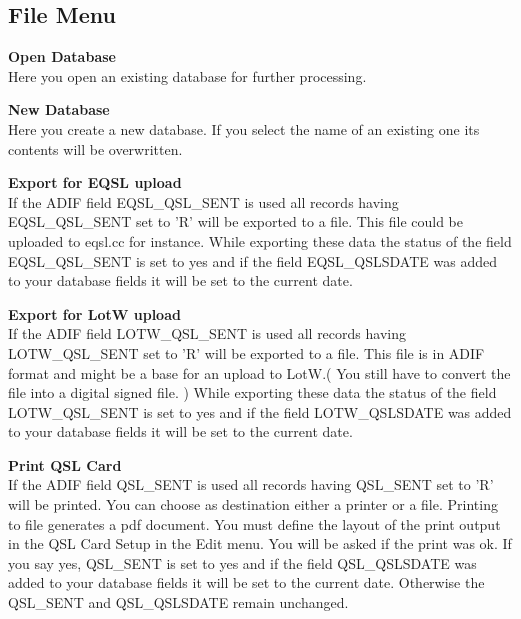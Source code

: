 \documentclass[a4paper,11pt]{article}
\begin{document}
\subsection{File Menu}
\begin{flushleft}


\textbf{Open Database}\\
Here you open an existing database for further processing.\linebreak

\textbf{New Database}\\
Here you create a new database. If you select the name of an existing one its
contents will be overwritten.\linebreak

\textbf{Export for EQSL upload}\\
If the ADIF field EQSL\_QSL\_SENT is used all records having EQSL\_QSL\_SENT
set to ’R’ will be exported to a file. This file could be uploaded to eqsl.cc for
instance. While exporting these data the status of the field EQSL\_QSL\_SENT
is set to yes and if the field EQSL\_QSLSDATE was added to your database
fields it will be set to the current date.\linebreak

\textbf{Export for LotW upload}\\
If the ADIF field LOTW\_QSL\_SENT is used all records having LOTW\_QSL\_SENT
set to ’R’ will be exported to a file. This file is in ADIF format and might
be a base for an upload to LotW.( You still have to convert the file into
a digital signed file. ) While exporting these data the status of the field
LOTW\_QSL\_SENT is set to yes and if the field LOTW\_QSLSDATE was added
to your database fields it will be set to the current date.\linebreak

\textbf{Print QSL Card}\\
If the ADIF field QSL\_SENT is used all records having QSL\_SENT set to ’R’
will be printed. You can choose as destination either a printer or a file. Printing
to file generates a pdf document. You must define the layout of the print output
in the QSL Card Setup in the Edit menu. You will be asked if the print was ok.
If you say yes, QSL\_SENT is set to yes and if the field QSL\_QSLSDATE was
added to your database fields it will be set to the current date. Otherwise the
QSL\_SENT and QSL\_QSLSDATE remain unchanged.\linebreak


\end{flushleft}
\end{document}

